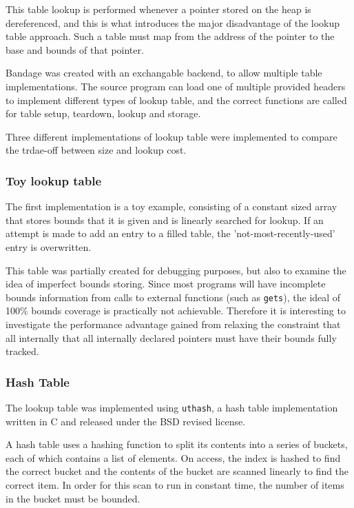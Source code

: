 This table lookup is performed whenever a pointer stored on the heap is dereferenced, and this is what introduces the major disadvantage of the lookup table approach.
Such a table must map from the address of the pointer to the base and bounds of that pointer.

Bandage was created with an exchangable backend, to allow multiple table implementations.
The source program can load one of multiple provided headers to implement different types of lookup table, and the correct functions are called for table setup, teardown, lookup and storage.

Three different implementations of lookup table were implemented to compare the trdae-off between size and lookup cost.

\subsubsection{Toy lookup table}

The first implementation is a toy example, consisting of a constant sized array that stores bounds that it is given and is linearly searched for lookup.
If an attempt is made to add an entry to a filled table, the 'not-most-recently-used' entry is overwritten.

This table was partially created for debugging purposes, but also to examine the idea of imperfect bounds storing.
Since most programs will have incomplete bounds information from calls to external functions (such as \verb!gets!), the ideal of 100\% bounds coverage is practically not achievable.
Therefore it is interesting to investigate the performance advantage gained from relaxing the constraint that all internally that all internally declared pointers must have their bounds fully tracked.

\subsubsection{Hash Table}

The lookup table was implemented using \verb!uthash!, a hash table implementation written in C and released under the BSD revised license. 

A hash table uses a hashing function to split its contents into a series of buckets, each of which contains a list of elements.
On access, the index is hashed to find the correct bucket and the contents of the bucket are scanned linearly to find the correct item.
In order for this scan to run in constant time, the number of items in the bucket must be bounded.

